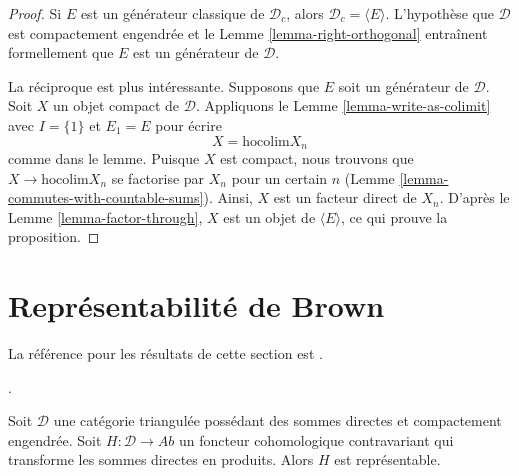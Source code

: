 \begin{proof}
Si $E$ est un générateur classique de $\mathcal{D}_c$, alors
$\mathcal{D}_c = \langle E \rangle$. L'hypothèse que $\mathcal{D}$ est
compactement engendrée et le Lemme \ref{lemma-right-orthogonal} entraînent
formellement que $E$ est un générateur de $\mathcal{D}$.

\medskip\noindent
La réciproque est plus intéressante. Supposons que $E$ soit un générateur de
$\mathcal{D}$. Soit $X$ un objet compact de $\mathcal{D}$.
Appliquons le Lemme \ref{lemma-write-as-colimit} avec $I = \{1\}$ et
$E_1 = E$ pour écrire
$$
X = \text{hocolim} X_n
$$
comme dans le lemme. Puisque $X$ est compact, nous trouvons que
$X \to \text{hocolim} X_n$ se factorise par $X_n$ pour un certain $n$
(Lemme \ref{lemma-commutes-with-countable-sums}).
Ainsi, $X$ est un facteur direct de $X_n$.
D'après le Lemme \ref{lemma-factor-through}, $X$ est un objet de
$\langle E \rangle$, ce qui prouve la proposition.
\end{proof}

\section{Représentabilité de Brown}
\label{section-brown}

\noindent
La référence pour les résultats de cette section est
\cite{Neeman-Grothendieck}.

\begin{lemma}
\label{lemma-brown}
\begin{reference}
\cite[Theorem 3.1]{Neeman-Grothendieck}.
\end{reference}
Soit $\mathcal{D}$ une catégorie triangulée possédant des sommes directes et
compactement engendrée. Soit $H : \mathcal{D} \to \textit{Ab}$ un foncteur
cohomologique contravariant qui transforme les sommes directes en produits.
Alors $H$ est représentable.
\end{lemma}

